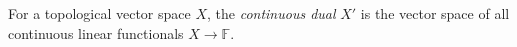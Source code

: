 
For a topological vector space $X$, the \emph{continuous dual} $X'$ is the vector space of all continuous linear functionals $X\to\mathbb F$.
